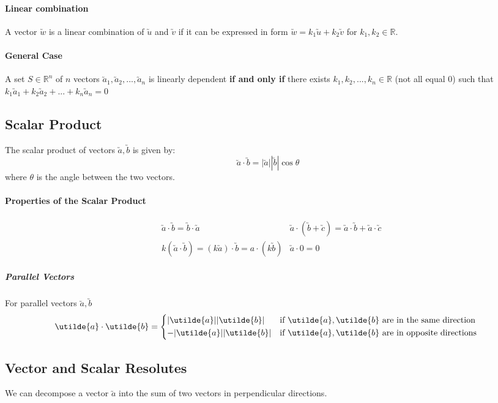 \documentclass[a4paper,twoside]{article}
\begin{document}
			\paragraph{Linear combination} A vector $\utilde{w}$ is a linear combination of $\utilde{u}$ and $\utilde{v}$ if it can be expressed in form $\utilde{w}=k_1\utilde{u}+k_2\utilde{v}$ for $k_1,k_2\in\mathbb{R}$.
			\paragraph{General Case} A set $S\in\mathbb{R}^n$ of $n$ vectors $\utilde{a}_1,\utilde{a}_2,...,\utilde{a}_n$ is linearly dependent \textbf{if and only if} there exists $k_1,k_2,...,k_n\in\mathbb{R}$ (not all equal 0) such that $k_1\utilde{a}_1+k_2\utilde{a}_2+...+k_n\utilde{a}_n=0$
		\subsection{Scalar Product}
			The scalar product of vectors $\utilde{a},\utilde{b}$ is given by:
			\[
			\utilde{a}\cdot\utilde{b}=|\utilde{a}||\utilde{b}|\cos\theta
			\]
			where $\theta$ is the angle between the two vectors.
			\paragraph{Properties of the Scalar Product}
			\begin{align*}
				&\utilde{a}\cdot\utilde{b}=\utilde{b}\cdot\utilde{a} &\utilde{a}\cdot\left(\utilde{b}+\utilde{c}\right)=\utilde{a}\cdot\utilde{b}+\utilde{a}\cdot\utilde{c} \\
				&k\left(\utilde{a}\cdot\utilde{b}\right)=\left(k\utilde{a}\right)\cdot\utilde{b}=a\cdot\left(k\utilde{b}\right) &\utilde{a}\cdot0=0
			\end{align*}
				\subparagraph{Parallel Vectors} For parallel vectors $\utilde{a},\utilde{b}$
				\[
					\utilde{a}\cdot\utilde{b}=\begin{cases*}
						|\utilde{a}||\utilde{b}| & if $\utilde{a},\utilde{b}$ are in the same direction \\
						-|\utilde{a}||\utilde{b}| & if $\utilde{a},\utilde{b}$ are in opposite directions
					\end{cases*}
				\]
		\subsection{Vector and Scalar Resolutes}
			We can decompose a vector $\utilde{a}$ into the sum of two vectors in perpendicular directions.
\end{document}
